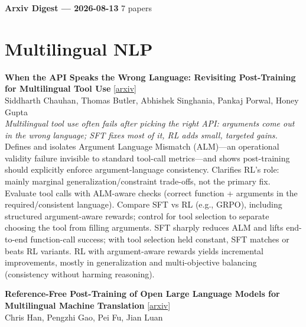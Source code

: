 \documentclass[12pt,letterpaper]{article}
\begin{document}
{\footnotesize\textbf{Arxiv Digest --- 2026-08-13} \hfill 7 papers}

\smallskip

\section*{Multilingual NLP}

{\small\textbf{When the API Speaks the Wrong Language: Revisiting Post-Training for Multilingual Tool Use}} {\scriptsize[\href{https://arxiv.org/abs/2608.11715}{arxiv}]}\\
{\scriptsize Siddharth Chauhan, Thomas Butler, Abhishek Singhania, Pankaj Porwal, Honey Gupta}\\

{\small\textit{Multilingual tool use often fails after picking the right API: arguments come out in the wrong language; SFT fixes most of it, RL adds small, targeted gains.}}\\[1pt]
{\footnotesize Defines and isolates Argument Language Mismatch (ALM)---an operational validity failure invisible to standard tool-call metrics---and shows post-training should explicitly enforce argument-language consistency. Clarifies RL's role: mainly marginal generalization/constraint trade-offs, not the primary fix. Evaluate tool calls with ALM-aware checks (correct function + arguments in the required/consistent language). Compare SFT vs RL (e.g., GRPO), including structured argument-aware rewards; control for tool selection to separate choosing the tool from filling arguments. SFT sharply reduces ALM and lifts end-to-end function-call success; with tool selection held constant, SFT matches or beats RL variants. RL with argument-aware rewards yields incremental improvements, mostly in generalization and multi-objective balancing (consistency without harming reasoning).}

\medskip

{\small\textbf{Reference-Free Post-Training of Open Large Language Models for Multilingual Machine Translation}} {\scriptsize[\href{https://arxiv.org/abs/2608.10812}{arxiv}]}\\
{\scriptsize Chris Han, Pengzhi Gao, Pei Fu, Jian Luan}\\
\end{document}
